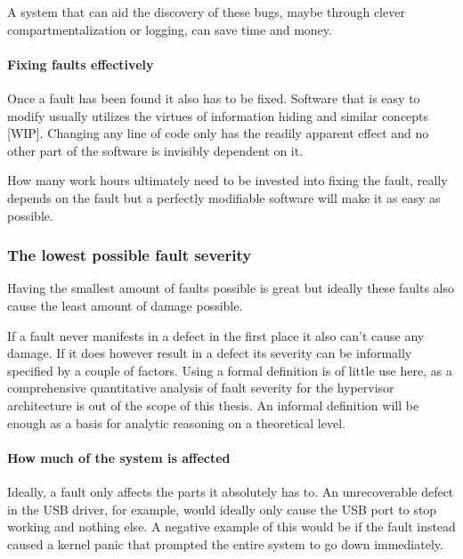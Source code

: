 A system that can aid the discovery of these bugs, maybe through clever compartmentalization or logging, can save time and money.
\paragraph{Fixing faults effectively}
Once a fault has been found it also has to be fixed. Software that is easy to modify usually utilizes the virtues of information hiding and similar  concepts [WIP]. Changing any line of code only has the readily apparent effect and no other part of the software is invisibly dependent on it.

How many work hours ultimately need to be invested into fixing the fault, really depends on the fault but a perfectly modifiable software will make it as easy as possible.
\subsubsection{The lowest possible fault severity}
Having the smallest amount of faults possible is great but ideally these faults also cause the least amount of damage possible. 

If a fault never manifests in a defect in the first place it also can't cause any damage. If it does however result in a defect its severity can be informally specified by a couple of factors. Using a formal definition is of little use here, as a comprehensive quantitative analysis of fault severity for the hypervisor architecture is out of the scope of this thesis. An informal definition will be enough as a basis for analytic reasoning on a theoretical level.
\paragraph{How much of the system is affected}
Ideally,  a fault only affects the parts it absolutely has to. An unrecoverable defect in the USB driver, for example, would ideally only cause the USB port to stop working and nothing else. A negative example of this would be if the fault instead caused a kernel panic that prompted the entire system to go down immediately.
